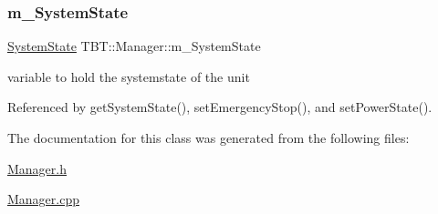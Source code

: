 \subsubsection{\texorpdfstring{m\+\_\+\+System\+State}{m\_SystemState}}
{\footnotesize\ttfamily \hyperlink{structTBT_1_1SystemState}{System\+State} T\+B\+T\+::\+Manager\+::m\+\_\+\+System\+State\hspace{0.3cm}{\ttfamily [private]}}



variable to hold the systemstate of the unit 



Referenced by get\+System\+State(), set\+Emergency\+Stop(), and set\+Power\+State().



The documentation for this class was generated from the following files\+:\begin{DoxyCompactItemize}
\item 
\hyperlink{Manager_8h}{Manager.\+h}\item 
\hyperlink{Manager_8cpp}{Manager.\+cpp}\end{DoxyCompactItemize}
